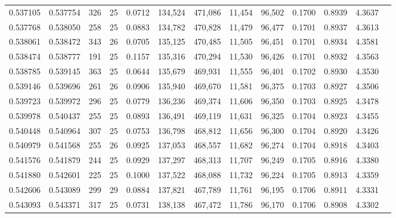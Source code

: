 \begin{tabular}{rrrrrrrrrrrrr}
0.537105 & 0.537754 &   326 &  25 &                                     0.0712 & 134,524 & 471,086 &  11,454 &  96,502 & 0.1700 & 0.8939 & 4.3637 \\
0.537768 & 0.538050 &   258 &  25 &                                     0.0883 & 134,782 & 470,828 &  11,479 &  96,477 & 0.1701 & 0.8937 & 4.3613 \\
0.538061 & 0.538472 &   343 &  26 &                                     0.0705 & 135,125 & 470,485 &  11,505 &  96,451 & 0.1701 & 0.8934 & 4.3581 \\
0.538474 & 0.538777 &   191 &  25 &                                     0.1157 & 135,316 & 470,294 &  11,530 &  96,426 & 0.1701 & 0.8932 & 4.3563 \\
0.538785 & 0.539145 &   363 &  25 &                                     0.0644 & 135,679 & 469,931 &  11,555 &  96,401 & 0.1702 & 0.8930 & 4.3530 \\
0.539146 & 0.539696 &   261 &  26 &                                     0.0906 & 135,940 & 469,670 &  11,581 &  96,375 & 0.1703 & 0.8927 & 4.3506 \\
0.539723 & 0.539972 &   296 &  25 &                                     0.0779 & 136,236 & 469,374 &  11,606 &  96,350 & 0.1703 & 0.8925 & 4.3478 \\
0.539978 & 0.540437 &   255 &  25 &                                     0.0893 & 136,491 & 469,119 &  11,631 &  96,325 & 0.1704 & 0.8923 & 4.3455 \\
0.540448 & 0.540964 &   307 &  25 &                                     0.0753 & 136,798 & 468,812 &  11,656 &  96,300 & 0.1704 & 0.8920 & 4.3426 \\
0.540979 & 0.541568 &   255 &  26 &                                     0.0925 & 137,053 & 468,557 &  11,682 &  96,274 & 0.1704 & 0.8918 & 4.3403 \\
0.541576 & 0.541879 &   244 &  25 &                                     0.0929 & 137,297 & 468,313 &  11,707 &  96,249 & 0.1705 & 0.8916 & 4.3380 \\
0.541880 & 0.542601 &   225 &  25 &                                     0.1000 & 137,522 & 468,088 &  11,732 &  96,224 & 0.1705 & 0.8913 & 4.3359 \\
0.542606 & 0.543089 &   299 &  29 &                                     0.0884 & 137,821 & 467,789 &  11,761 &  96,195 & 0.1706 & 0.8911 & 4.3331 \\
0.543093 & 0.543371 &   317 &  25 &                                     0.0731 & 138,138 & 467,472 &  11,786 &  96,170 & 0.1706 & 0.8908 & 4.3302 \\

\end{tabular}
